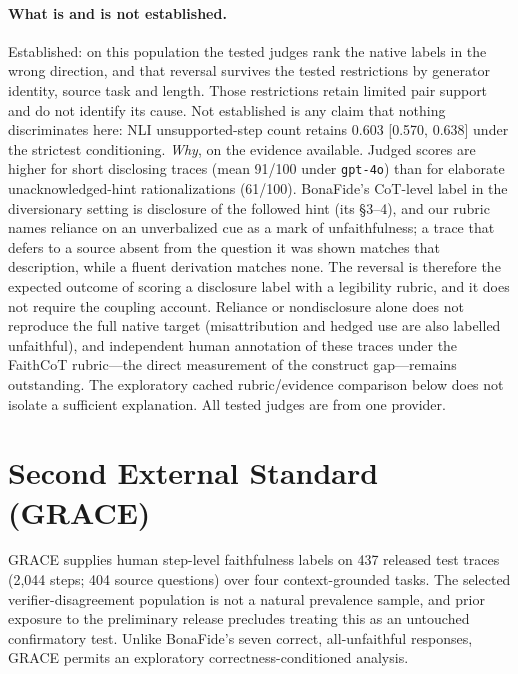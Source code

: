 \documentclass[11pt]{article}
\begin{document}
\paragraph{What is and is not established.} Established: on this population the tested judges rank
the native labels in the wrong direction, and that reversal survives the tested
restrictions by generator identity, source task and length. Those restrictions
retain limited pair support and do not identify its cause. Not established is any claim that
nothing discriminates here: NLI unsupported-step count retains 0.603 [0.570, 0.638] under the
strictest conditioning.
\emph{Why}, on the evidence available. Judged scores are higher for short disclosing traces (mean 91/100 under
\texttt{gpt-4o}) than for elaborate unacknowledged-hint rationalizations (61/100). BonaFide's
CoT-level label in the diversionary setting is disclosure of the followed hint (its \S3--4), and
our rubric names reliance on an unverbalized cue as a mark of unfaithfulness; a trace that
defers to a source absent from the question it was shown matches that description, while a
fluent derivation matches none. The reversal is therefore the expected outcome of scoring a
disclosure label with a legibility rubric, and it does not require the coupling account.
Reliance or nondisclosure alone does not reproduce the full native target (misattribution and
hedged use are also labelled unfaithful), and independent human annotation of these traces under
the FaithCoT rubric---the direct measurement of the construct gap---remains outstanding. The exploratory cached rubric/evidence comparison below
does not isolate a sufficient explanation. All tested judges are from one provider.



\section{Second External Standard (GRACE)}
\label{app:grace}

GRACE \citep{pham2026grace} supplies human step-level faithfulness labels on 437
released test traces (2,044 steps; 404 source questions) over four context-grounded
tasks. The selected verifier-disagreement population is not a natural prevalence
sample, and prior exposure to the preliminary release precludes treating this as
an untouched confirmatory test. Unlike BonaFide's seven correct, all-unfaithful
responses, GRACE permits an exploratory correctness-conditioned analysis.
\end{document}
